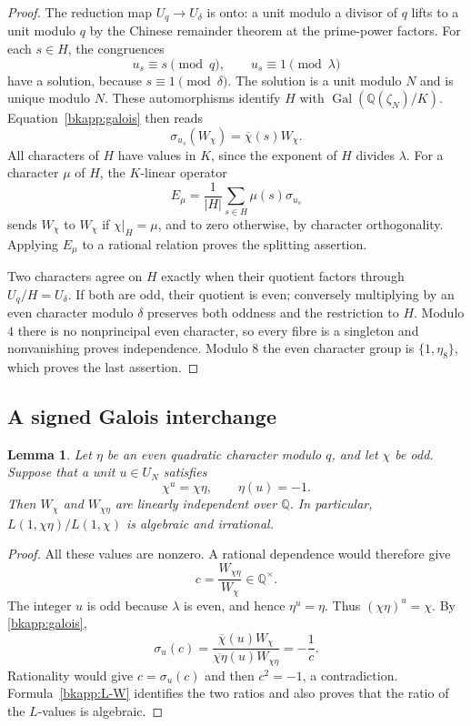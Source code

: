 \documentclass[11pt,a4paper]{article}
\newtheorem{lemma}[theorem]{Lemma}
\theoremstyle{definition}
\theoremstyle{remark}
\begin{document}
\begin{proof}
The reduction map $U_q\longrightarrow U_\delta$ is onto: a unit
modulo a divisor of $q$ lifts to a unit modulo $q$ by the Chinese
remainder theorem at the prime-power factors.
For each $s\in H$, the congruences
\[
 u_s\equiv s\pmod q,
 \qquad u_s\equiv1\pmod\lambda
\]
have a solution, because $s\equiv1\pmod\delta$.
The solution is a unit modulo $N$ and is unique modulo $N$.
These automorphisms identify $H$ with
$\operatorname{Gal}(\mathbb Q(\zeta_N)/K)$.
Equation~\eqref{bkapp:galois} then reads
\[
 \sigma_{u_s}(W_\chi)=\overline\chi(s)W_\chi.
\]
All characters of $H$ have values in $K$, since the exponent of $H$
divides $\lambda$.  For a character $\mu$ of $H$, the $K$-linear
operator
\[
 E_\mu=\frac1{|H|}\sum_{s\in H}\mu(s)\sigma_{u_s}
\]
sends $W_\chi$ to $W_\chi$ if $\chi|_H=\mu$, and to zero otherwise,
by character orthogonality.  Applying $E_\mu$ to a rational relation
proves the splitting assertion.

Two characters agree on $H$ exactly when their quotient factors
through $U_q/H=U_\delta$.  If both are odd, their quotient is even;
conversely multiplying by an even character modulo $\delta$
preserves both oddness and the restriction to $H$.
Modulo $4$ there is no nonprincipal even character, so every fibre
is a singleton and nonvanishing proves independence.  Modulo $8$
the even character group is $\{1,\eta_8\}$, which proves the last
assertion.
\end{proof}

\subsection{A signed Galois interchange}

\begin{lemma}
\label{bkapp:negative-swap}
Let $\eta$ be an even quadratic character modulo $q$, and let $\chi$
be odd.  Suppose that a unit $u\in U_N$ satisfies
\[
 \chi^u=\chi\eta,
 \qquad \eta(u)=-1.
\]
Then $W_\chi$ and $W_{\chi\eta}$ are linearly independent over
$\mathbb Q$.  In particular,
$L(1,\chi\eta)/L(1,\chi)$ is algebraic and irrational.
\end{lemma}

\begin{proof}
All these values are nonzero.  A rational dependence would therefore
give
\[
 c=\frac{W_{\chi\eta}}{W_\chi}\in\mathbb Q^\times.
\]
The integer $u$ is odd because $\lambda$ is even, and hence
$\eta^u=\eta$.  Thus $(\chi\eta)^u=\chi$.
By \eqref{bkapp:galois},
\[
 \sigma_u(c)
 =\frac{\overline\chi(u)W_\chi}
        {\overline{\chi\eta}(u)W_{\chi\eta}}
 =-\frac1c.
\]
Rationality would give $c=\sigma_u(c)$ and then $c^2=-1$, a
contradiction.  Formula~\eqref{bkapp:L-W} identifies the two
ratios and also proves that the ratio of the $L$-values is algebraic.
\end{proof}
\end{document}
